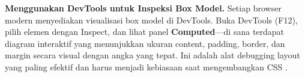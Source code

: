 \begin{konsep}
\textbf{Menggunakan DevTools untuk Inspeksi Box Model.} Setiap browser modern menyediakan visualisasi box model di DevTools. Buka DevTools (F12), pilih elemen dengan Inspect, dan lihat panel \textbf{Computed}---di sana terdapat diagram interaktif yang menunjukkan ukuran content, padding, border, dan margin secara visual dengan angka yang tepat. Ini adalah alat debugging layout yang paling efektif dan harus menjadi kebiasaan saat mengembangkan CSS \cite{mdnCss}.
\end{konsep}

